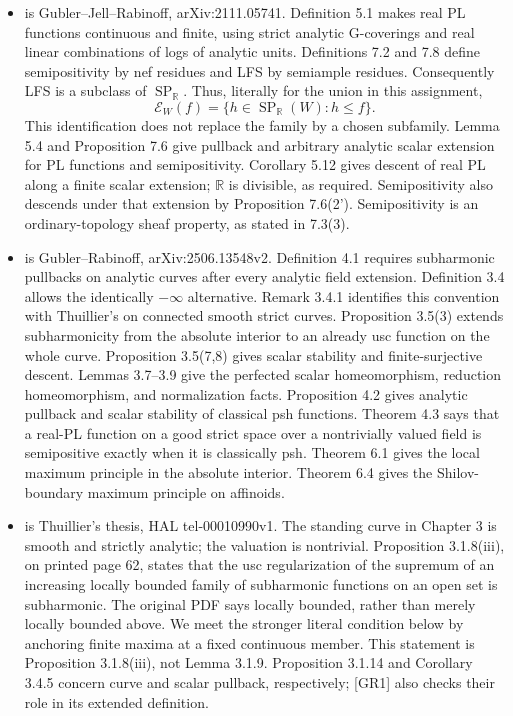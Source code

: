 \documentclass[11pt,a4paper]{article}
\begin{document}
\begin{itemize}
\item [GJR] is Gubler--Jell--Rabinoff, arXiv:2111.05741. Definition 5.1 makes real PL functions continuous and finite, using strict analytic G-coverings and real linear combinations of logs of analytic units. Definitions 7.2 and 7.8 define semipositivity by nef residues and LFS by semiample residues. Consequently LFS is a subclass of \(\operatorname{SP}_{\mathbb R}\). Thus, literally for the union in this assignment,
\[
  \mathcal E_W(f)=\{h\in\operatorname{SP}_{\mathbb R}(W):h\leq f\}.
  \]
This identification does not replace the family by a chosen subfamily. Lemma 5.4 and Proposition 7.6 give pullback and arbitrary analytic scalar extension for PL functions and semipositivity. Corollary 5.12 gives descent of real PL along a finite scalar extension; \(\mathbb R\) is divisible, as required. Semipositivity also descends under that extension by Proposition 7.6(2'). Semipositivity is an ordinary-topology sheaf property, as stated in 7.3(3).

\item [GR1] is Gubler--Rabinoff, arXiv:2506.13548v2. Definition 4.1 requires subharmonic pullbacks on analytic curves after every analytic field extension. Definition 3.4 allows the identically \(-\infty\) alternative. Remark 3.4.1 identifies this convention with Thuillier's on connected smooth strict curves. Proposition 3.5(3) extends subharmonicity from the absolute interior to an already usc function on the whole curve. Proposition 3.5(7,8) gives scalar stability and finite-surjective descent. Lemmas 3.7--3.9 give the perfected scalar homeomorphism, reduction homeomorphism, and normalization facts. Proposition 4.2 gives analytic pullback and scalar stability of classical psh functions. Theorem 4.3 says that a real-PL function on a good strict space over a nontrivially valued field is semipositive exactly when it is classically psh. Theorem 6.1 gives the local maximum principle in the absolute interior. Theorem 6.4 gives the Shilov-boundary maximum principle on affinoids.

\item [Thu] is Thuillier's thesis, HAL tel-00010990v1. The standing curve in Chapter 3 is smooth and strictly analytic; the valuation is nontrivial. Proposition 3.1.8(iii), on printed page 62, states that the usc regularization of the supremum of an increasing locally bounded family of subharmonic functions on an open set is subharmonic. The original PDF says locally bounded, rather than merely locally bounded above. We meet the stronger literal condition below by anchoring finite maxima at a fixed continuous member. This statement is Proposition 3.1.8(iii), not Lemma 3.1.9. Proposition 3.1.14 and Corollary 3.4.5 concern curve and scalar pullback, respectively; [GR1] also checks their role in its extended definition.


\end{itemize}
\end{document}
